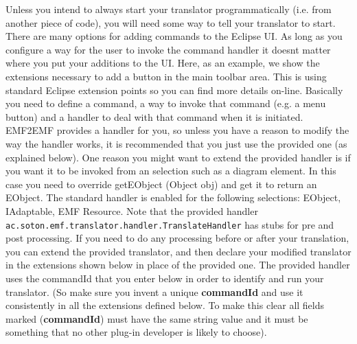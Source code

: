 Unless you intend to always start your translator programmatically (i.e. from another piece of code), you will need some way to tell your translator to start.
There are many options for adding commands to the Eclipse UI. As long as you configure a way for the user to invoke the command handler it doesnt matter where you put your additions to the UI. Here, as an example, we show the extensions necessary to add a button in the main toolbar area. This is using standard Eclipse extension points so you can find more details on-line. Basically you need to define a command, a way to invoke that command (e.g. a menu button) and a handler to deal with that command when it is initiated.
EMF2EMF provides a handler for you, so unless you have a reason to modify the way the handler works, it is recommended that you just use the provided one (as explained below). One reason you might want to extend the provided handler is if you want it to be invoked from an selection such as a diagram element. In this case you need to override getEObject (Object obj) and get it to return an EObject. The standard handler is enabled for the following selections: EObject, IAdaptable,  EMF Resource. Note that the provided handler \texttt{ac.soton.emf.translator.handler.TranslateHandler} has stubs for pre and post processing. If you need to do any processing before or after your translation, you can extend the provided translator, and then declare your modified translator in the extensions shown below in place of the provided one. The provided handler uses the commandId that you enter below in order to identify and run your translator. (So make sure you invent a unique \textbf{commandId} and use it consistently in all the extensions defined below. To make this clear all fields marked (\textbf{commandId}) must have the same string value and it must be something that no other plug-in developer is likely to choose).


